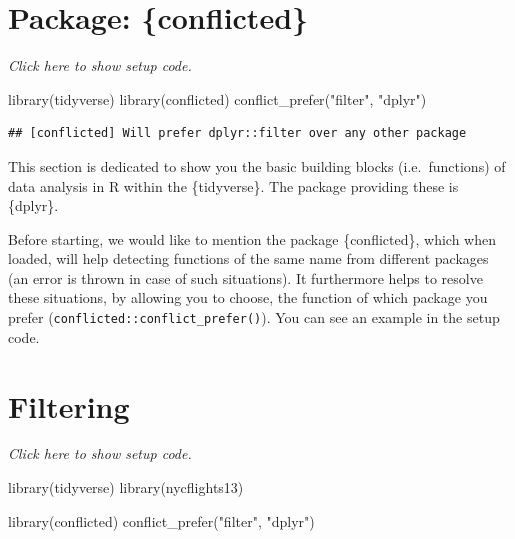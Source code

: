 \documentclass[]{book}
\newenvironment{Shaded}{}{}
\newcommand{\KeywordTok}[1]{\textcolor[rgb]{0.00,0.00,1.00}{#1}}
\newcommand{\NormalTok}[1]{#1}
\newcommand{\StringTok}[1]{\textcolor[rgb]{0.00,0.50,0.50}{#1}}
\begin{document}
\hypertarget{package-conflicted}{%
\section{Package: \{conflicted\}}\label{package-conflicted}}

\emph{Click here to show setup code.}

\begin{Shaded}
\begin{Highlighting}[]
\KeywordTok{library}\NormalTok{(tidyverse)}
\KeywordTok{library}\NormalTok{(conflicted)}
\KeywordTok{conflict_prefer}\NormalTok{(}\StringTok{"filter"}\NormalTok{, }\StringTok{"dplyr"}\NormalTok{)}
\end{Highlighting}
\end{Shaded}

\begin{verbatim}
## [conflicted] Will prefer dplyr::filter over any other package
\end{verbatim}

This section is dedicated to show you the basic building blocks (i.e.~functions) of data analysis in R within the \{tidyverse\}.
The package providing these is \{dplyr\}.

Before starting, we would like to mention the package \{conflicted\}, which when loaded, will help detecting functions of the same name from different packages (an error is thrown in case of such situations).
It furthermore helps to resolve these situations, by allowing you to choose, the function of which package you prefer (\texttt{conflicted::conflict\_prefer()}).
You can see an example in the setup code.

\hypertarget{filtering}{%
\section{Filtering}\label{filtering}}

\emph{Click here to show setup code.}

\begin{Shaded}
\begin{Highlighting}[]
\KeywordTok{library}\NormalTok{(tidyverse)}
\KeywordTok{library}\NormalTok{(nycflights13)}

\KeywordTok{library}\NormalTok{(conflicted)}
\KeywordTok{conflict_prefer}\NormalTok{(}\StringTok{"filter"}\NormalTok{, }\StringTok{"dplyr"}\NormalTok{)}
\end{Highlighting}
\end{Shaded}
\end{document}
